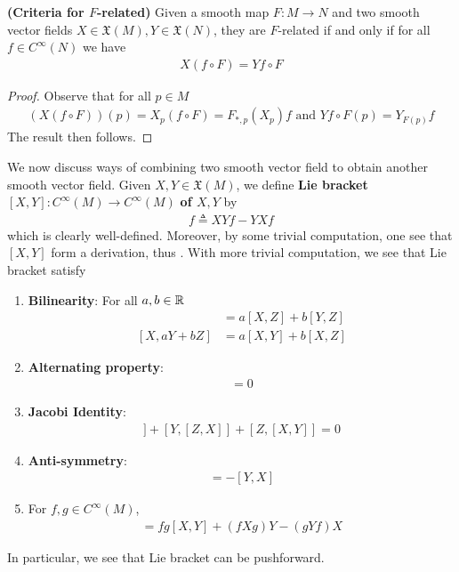 \documentclass{report}
\begin{document}
\begin{theorem}
\label{Cfr}
\textbf{(Criteria for $F$-related)} Given a smooth map $F:M\rightarrow N$ and two smooth vector fields $X\in \mathfrak{X}(M),Y\in \mathfrak{X}(N)$, they are $F$-related if and only if for all  $f \in C^{\infty}(N)$ we have 
\begin{align*}
X(f \circ F)=Yf \circ F
\end{align*}
\end{theorem}
\begin{proof}
Observe that for all $p \in M$
\begin{align*}
  (X(f \circ F))(p)=X_p (f\circ F)=F_{*,p}(X_p)f\text{ and }Yf\circ F(p)=Y_{F(p)}f
\end{align*}
The result then follows. 
\end{proof}
\begin{mdframed}
We now discuss ways of combining two smooth vector field to obtain another smooth vector field. Given $X,Y \in \mathfrak{X}(M)$, we define \textbf{Lie bracket} $[X,Y]:C^{\infty}(M)\rightarrow C^{\infty}(M)$ \textbf{of $X,Y$} by 
\begin{align*}
[X,Y]f\triangleq XYf-YXf
\end{align*}
which is clearly well-defined. Moreover, by some trivial computation, one see that  $[X,Y]$ form a derivation, thus . With more trivial computation, we see that Lie bracket satisfy 
\begin{enumerate}[label=(\alph*)]
  \item \textbf{Bilinearity}: For all $a,b \in\mathbb{R}$ 
    \begin{align*}
    [aX+bY,Z]&=a[X,Z]+b[Y,Z]\\
    [X,aY+bZ]&= a[X,Y]+b[X,Z]
    \end{align*} 
    \item \textbf{Alternating property}: 
    \begin{align*}
    [X,X]=0
    \end{align*} 
    \item \textbf{Jacobi Identity}: 
    \begin{align*}
    [X,[Y,Z]]+[Y,[Z,X]]+[Z,[X,Y]]=0
    \end{align*} 
    \item \textbf{Anti-symmetry}:
      \begin{align*}
      [X,Y]=-[Y,X]
      \end{align*} 
      \item For $f,g\in C^{\infty}(M)$, 
        \begin{align*}
        [fX,gY]=fg[X,Y]+(fXg)Y-(gYf)X
        \end{align*}
\end{enumerate}
In particular, we see that Lie bracket can be pushforward.  
\end{mdframed}
\end{document}
